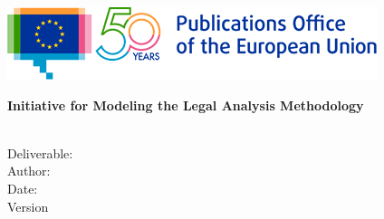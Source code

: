 \begin{center}
\vspace{1cm}

  \begin{center}


  \includegraphics[scale=.71]{images/logos/OP-50years-EN}
  \vspace{2mm}

  \end{center}
  \vspace{4cm}
  \textbf{{\large Initiative for Modeling the Legal Analysis Methodology\\}}
  \vspace{2cm}
  
  \begin{spacing}{2.5}
   \textbf{\Huge \DelTitle}\\ \vspace{2cm}
   {\large Deliverable: \DelNumber} \\ %
	 {\large Author: \DelAuthor} \\ %
	 {\large Date: \DelDate} \\ %
   {\large Version \DelVersion}
  \end{spacing}
  
  \vspace*{\fill}


\end{center}

